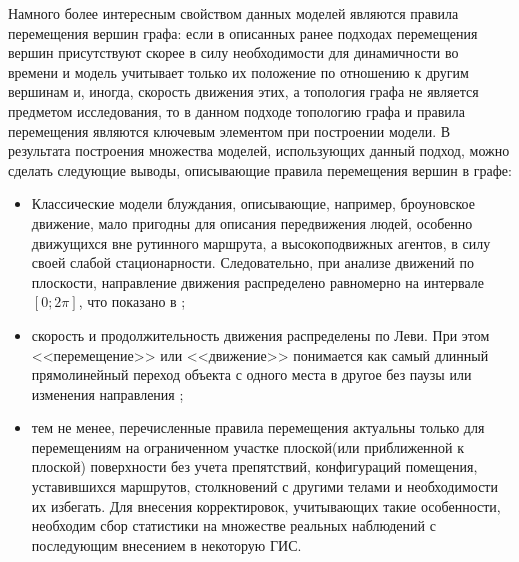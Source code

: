 Намного более интересным свойством данных моделей являются правила перемещения вершин графа: если в описанных ранее подходах перемещения вершин присутствуют скорее в силу необходимости для динамичности во времени и модель учитывает только их положение по отношению к другим вершинам и, иногда, скорость движения этих, а топология графа не является предметом исследования, то в данном подходе топологию графа и правила перемещения являются ключевым  элементом  при построении модели. В результата построения множества моделей, использующих данный подход, можно сделать следующие выводы, описывающие правила перемещения вершин в графе:
\begin{itemize}
	\item Классические модели блуждания, описывающие, например,  броуновское движение, мало пригодны для описания передвижения людей, особенно движущихся вне рутинного маршрута, а высокоподвижных агентов, в силу своей слабой стационарности. Следовательно, при анализе  движений по плоскости, направление движения распределено равномерно на интервале $[0; 2\pi]$, что показано в %
	;
	\item скорость и продолжительность движения распределены по Леви. При этом <<перемещение>> или <<движение>> понимается как  самый длинный прямолинейный  переход объекта с одного места в другое без паузы или изменения направления %
	;	
	\item тем не менее, перечисленные правила перемещения актуальны только для перемещениям на ограниченном участке плоской(или приближенной к плоской)  поверхности без учета препятствий, конфигураций помещения, уставившихся маршрутов, столкновений с другими телами и необходимости их избегать. Для внесения корректировок, учитывающих такие особенности, необходим сбор статистики на множестве реальных наблюдений с последующим внесением в некоторую  ГИС. 
\end{itemize} 

